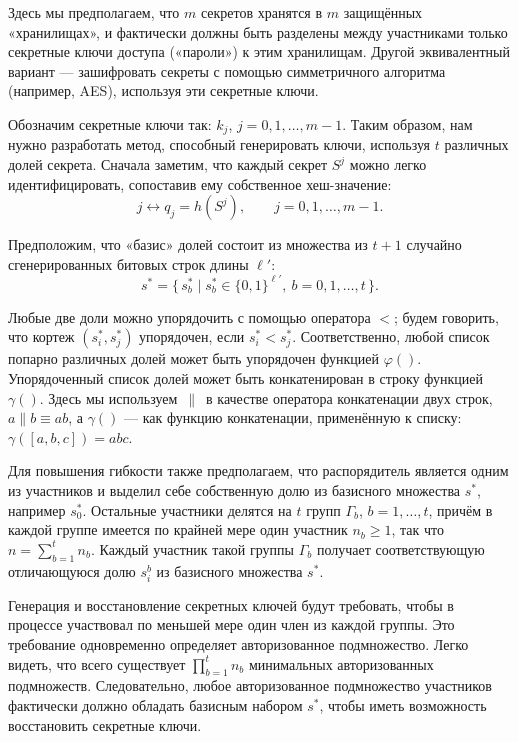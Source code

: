 Здесь мы предполагаем, что \(m\) секретов хранятся в \(m\) защищённых «хранилищах», и фактически должны быть разделены между участниками только секретные ключи доступа («пароли») к этим хранилищам. Другой эквивалентный вариант — зашифровать секреты с помощью симметричного алгоритма (например, AES), используя эти секретные ключи.

Обозначим секретные ключи так: \(k_j\), \(j=0,1,\ldots,m-1\). Таким образом, нам нужно разработать метод, способный генерировать ключи, используя \(t\) различных долей секрета. Сначала заметим, что каждый секрет \(S^j\) можно легко идентифицировать, сопоставив ему собственное хеш-значение:
\[
j \longleftrightarrow q_j = h(S^j), \qquad j=0,1,\ldots,m-1.
\tag{1}
\]

Предположим, что «базис» долей состоит из множества из \(t+1\) случайно сгенерированных битовых строк длины \(\ell'\):
\[
s^{\ast}=\{\, s^{\ast}_b \mid s^{\ast}_b \in \{0,1\}^{\ell'} ,\ b=0,1,\ldots,t \,\}.
\tag{2}
\]

Любые две доли можно упорядочить с помощью оператора \(<\); будем говорить, что кортеж \((s^{\ast}_i, s^{\ast}_j)\) упорядочен, если \(s^{\ast}_i < s^{\ast}_j\). Соответственно, любой список попарно различных долей может быть упорядочен функцией \(\varphi()\). Упорядоченный список долей может быть конкатенирован в строку функцией \(\gamma()\). Здесь мы используем \(\,\|\,\) в качестве оператора конкатенации двух строк, \(a\|b \equiv ab\), а \(\gamma()\) — как функцию конкатенации, применённую к списку: \(\gamma([a,b,c])=abc\).

Для повышения гибкости также предполагаем, что распорядитель является одним из участников и выделил себе собственную долю из базисного множества \(s^{\ast}\), например \(s^{\ast}_0\). Остальные участники делятся на \(t\) групп \(\Gamma_b\), \(b=1,\ldots,t\), причём в каждой группе имеется по крайней мере один участник \(n_b \ge 1\), так что \(n=\sum_{b=1}^{t} n_b\). Каждый участник такой группы \(\Gamma_b\) получает соответствующую отличающуюся долю \(s^{b}_i\) из базисного множества \(s^{\ast}\).

Генерация и восстановление секретных ключей будут требовать, чтобы в процессе участвовал по меньшей мере один член из каждой группы. Это требование одновременно определяет авторизованное подмножество. Легко видеть, что всего существует \(\prod_{b=1}^{t} n_b\) минимальных авторизованных подмножеств. Следовательно, любое авторизованное подмножество участников фактически должно обладать базисным набором \(s^{\ast}\), чтобы иметь возможность восстановить секретные ключи.

